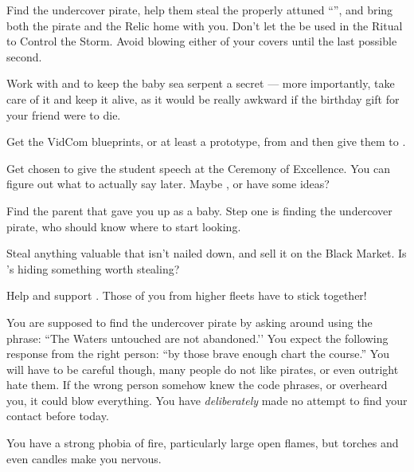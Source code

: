 \documentclass[char]{GL2020}
\begin{document}
\begin{itemz}
    \item Find the undercover pirate, help them steal the properly attuned ``\iNet{}'', and bring both the pirate and the Relic home with you. Don't let the \iNet{} be used in the Ritual to Control the Storm. Avoid blowing either of your covers until the last possible second.
    \item Work with \cDisney{} and \cAdopted{} to keep the baby sea serpent a secret — more importantly, take care of it and keep it alive, as it would be really awkward if the birthday gift for your friend were to die.
    \item Get the VidCom blueprints, or at least a prototype, from \cTechStar{} and then give them to \cChupLeader{}.
\end{itemz}

\begin{itemz}
    \item Get chosen to give the student speech at the Ceremony of Excellence. You can figure out what to actually say later. Maybe \cJuniorStatesman{}, \cChupAvenger{} or \cPirate{} have some ideas?
    \item Find the parent that gave you up as a baby. Step one is finding the undercover pirate, who should know where to start looking.
    \item Steal anything valuable that isn’t nailed down, and sell it on the Black Market. Is \cChupIventor{}’s hiding something worth stealing?
    \item Help and support \cWarlordDaughter{}. Those of you from higher fleets have to stick together!
\end{itemz}

\begin{itemz}[Notes]
    \item You are supposed to find the undercover pirate by asking around using the phrase: ``The Waters untouched are not abandoned.'’ You expect the following response from the right person: ``by those brave enough chart the course.'' You will have to be careful though, many people do not like pirates, or even outright hate them. If the wrong person somehow knew the code phrases, or overheard you, it could blow everything. You have \emph{deliberately} made no attempt to find your contact before today.
    \item You have a strong phobia of fire, particularly large open flames, but torches and even candles make you nervous.
\end{itemz}
\end{document}
